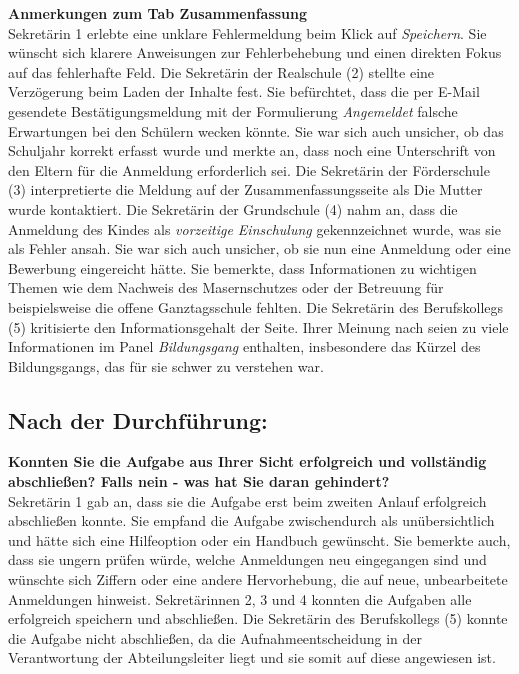 \textbf{Anmerkungen zum Tab \glqq Zusammenfassung\grqq{}}\\
Sekretärin 1 erlebte eine unklare Fehlermeldung beim Klick auf \textit{Speichern}. Sie wünscht sich klarere Anweisungen zur Fehlerbehebung und einen direkten Fokus auf das fehlerhafte Feld.
Die Sekretärin der Realschule (2) stellte eine Verzögerung beim Laden der Inhalte fest. Sie befürchtet, dass die per E-Mail gesendete Bestätigungsmeldung mit der Formulierung \textit{Angemeldet} falsche Erwartungen bei den Schülern wecken könnte. Sie war sich auch unsicher, ob das Schuljahr korrekt erfasst wurde und merkte an, dass noch eine Unterschrift von den Eltern für die Anmeldung erforderlich sei.
Die Sekretärin der Förderschule (3) interpretierte die Meldung auf der Zusammenfassungsseite als \glqq Die Mutter wurde kontaktiert\grqq{}.
Die Sekretärin der Grundschule (4) nahm an, dass die Anmeldung des Kindes als \textit{vorzeitige Einschulung} gekennzeichnet wurde, was sie als Fehler ansah. Sie war sich auch unsicher, ob sie nun eine \glqq Anmeldung\grqq{} oder eine \glqq Bewerbung\grqq{} eingereicht hätte. Sie bemerkte, dass Informationen zu wichtigen Themen wie dem Nachweis des Masernschutzes oder der Betreuung für beispielsweise die offene Ganztagsschule fehlten.
Die Sekretärin des Berufskollegs (5) kritisierte den Informationsgehalt der Seite. Ihrer Meinung nach seien zu viele Informationen im Panel \textit{Bildungsgang} enthalten, insbesondere das Kürzel des Bildungsgangs, das für sie schwer zu verstehen war.

\subsection{Nach der Durchführung:}

\textbf{Konnten Sie die Aufgabe aus Ihrer Sicht erfolgreich und vollständig abschließen? Falls nein - was hat Sie daran gehindert?}\\
Sekretärin 1 gab an, dass sie die Aufgabe erst beim zweiten Anlauf erfolgreich abschließen konnte. Sie empfand die Aufgabe zwischendurch als unübersichtlich und hätte sich eine Hilfeoption oder ein Handbuch gewünscht. Sie bemerkte auch, dass sie ungern prüfen würde, welche Anmeldungen neu eingegangen sind und wünschte sich Ziffern oder eine andere Hervorhebung, die auf neue, unbearbeitete Anmeldungen hinweist.
Sekretärinnen 2, 3 und 4 konnten die Aufgaben alle erfolgreich speichern und abschließen. 
Die Sekretärin des Berufskollegs (5) konnte die Aufgabe nicht abschließen, da die Aufnahmeentscheidung in der Verantwortung der Abteilungsleiter liegt und sie somit auf diese angewiesen ist. 

